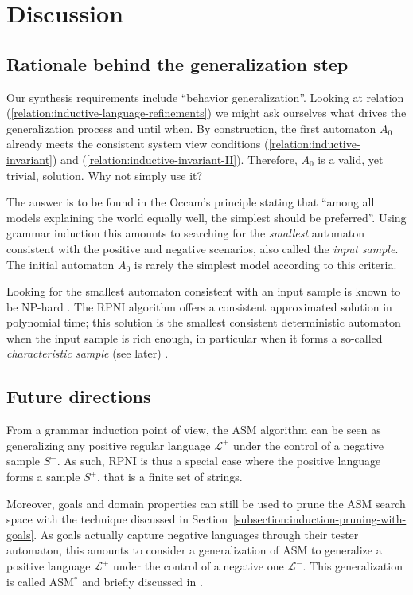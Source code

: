 \section{Discussion\label{section:inductive-synthesis-discussion}}

\subsection{Rationale behind the generalization step}

Our synthesis requirements include ``behavior generalization''. Looking at relation (\ref{relation:inductive-language-refinements}) we might ask ourselves what drives the generalization process and until when. By construction, the first automaton $A_0$ already meets the consistent system view conditions (\ref{relation:inductive-invariant}) and (\ref{relation:inductive-invariant-II}). Therefore, $A_0$ is a valid, yet trivial, solution. Why not simply use it?

The answer is to be found in the Occam's principle stating that ``among all models explaining the world equally well, the simplest should be preferred''. Using grammar induction this amounts to searching for the \emph{smallest} automaton consistent with the positive and negative scenarios, also called the \emph{input sample}. The initial automaton $A_0$ is rarely the simplest model according to this criteria. 

Looking for the smallest automaton consistent with an input sample is known to be NP-hard \cite{Gold:1978, Angluin:1978}. The RPNI algorithm offers a consistent approximated solution in polynomial time; this solution is the smallest consistent deterministic automaton when the input sample is rich enough, in particular when it forms a so-called \emph{characteristic sample} (see later) \cite{Oncina:1992}.

\subsection{Future directions}

From a grammar induction point of view, the ASM algorithm can be seen as generalizing any positive regular language $\mathcal{L}^+$ under the control of a negative sample $S^-$. As such, RPNI is thus a special case where the positive language forms a sample $S^+$, that is a finite set of strings.

Moreover, goals and domain properties can still be used to prune the ASM search space with the technique discussed in Section~\ref{subsection:induction-pruning-with-goals}. As goals actually capture negative languages through their tester automaton, this amounts to consider a generalization of ASM to generalize a positive language $\mathcal{L}^+$ under the control of a negative one $\mathcal{L}^-$. This generalization is called ASM$^*$ and briefly discussed in \cite{Lambeau:2008}.
